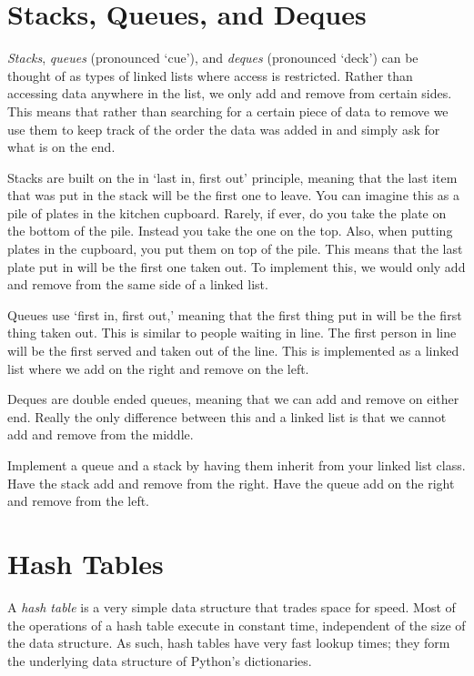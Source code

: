 \section*{Stacks, Queues, and Deques}
\emph{Stacks}, \emph{queues} (pronounced `cue'), and \emph{deques} (pronounced `deck') can be thought of as types of linked lists where access is restricted. Rather than accessing data anywhere in the list, we only add and remove from certain sides.
This means that rather than searching for a certain piece of data to remove we use them to keep track of the order the data was added in and simply ask for what is on the end.

Stacks are built on the in `last in, first out' principle, meaning that the last item that was put in the stack will be the first one to leave. You can imagine this as a pile of plates in the kitchen cupboard. Rarely, if ever, do you take the plate on the bottom of the pile. Instead you take the one on the top. Also, when putting plates in the cupboard, you put them on top of the pile. This means that the last plate put in will be the first one taken out. To implement this, we would only add and remove from the same side of a linked list.

Queues use `first in, first out,' meaning that the first thing put in will be the first thing taken out. This is similar to people waiting in line. The first person in line will be the first served and taken out of the line. This is implemented as a linked list where we add on the right and remove on the left.

Deques are double ended queues, meaning that we can add and remove on either end. Really the only difference between this and a linked list is that we cannot add and remove from the middle.

\begin{problem}
Implement a queue and a stack by having them inherit from your linked list class.
Have the stack add and remove from the right.
Have the queue add on the right and remove from the left.
\label{prob:Stack}
\end{problem}

\section*{Hash Tables}
A \emph{hash table} is a very simple data structure that trades space for speed.
Most of the operations of a hash table execute in constant time, independent of the size of the data structure.
As such, hash tables have very fast lookup times;  they form the underlying data structure of Python's dictionaries.

